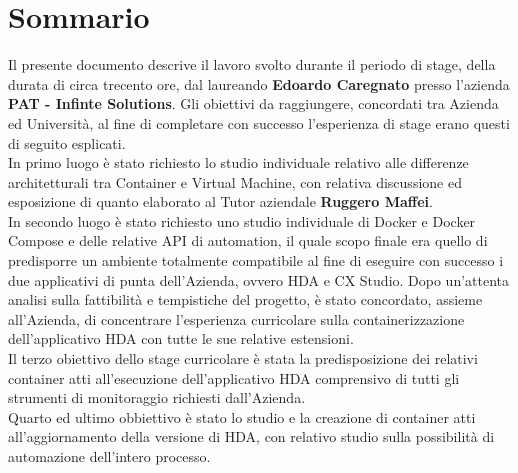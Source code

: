
\cleardoublepage
{}
{}
\begingroup
\let\clearpage\relax
\let\cleardoublepage\relax
\let\cleardoublepage\relax

\chapter*{Sommario}

Il presente documento descrive il lavoro svolto durante il periodo di stage, della durata di circa trecento ore, dal laureando \textbf{Edoardo Caregnato} presso l'azienda \textbf{PAT - Infinte Solutions}.
Gli obiettivi da raggiungere, concordati tra Azienda ed Università, al fine di completare con successo l'esperienza di stage erano questi di seguito esplicati.\\
In primo luogo è stato richiesto lo studio individuale relativo alle differenze architetturali tra \gls{Container} e \gls{Virtual Machine}, con relativa discussione ed esposizione di quanto elaborato al Tutor aziendale \textbf{Ruggero Maffei}.\\
In secondo luogo è stato richiesto uno studio individuale di \gls{Docker} e \gls{Docker Compose} e delle relative \gls{API} di automation, il quale scopo finale era quello di predisporre un ambiente totalmente compatibile al fine di eseguire con successo i due applicativi di punta dell'Azienda, ovvero \gls{HDA} e \gls{CX Studio}. Dopo un'attenta analisi sulla fattibilità e tempistiche del progetto, è stato concordato, assieme all'Azienda, di concentrare l'esperienza curricolare sulla containerizzazione dell'applicativo \gls{HDA} con tutte le sue relative estensioni.\\
Il terzo obiettivo dello stage curricolare è stata la predisposizione dei relativi container atti all'esecuzione dell'applicativo \gls{HDA} comprensivo di tutti gli strumenti di monitoraggio richiesti dall'Azienda.\\
Quarto ed ultimo obbiettivo è stato lo studio e la creazione di container atti all'aggiornamento della versione di \gls{HDA}, con relativo studio sulla possibilità di automazione dell'intero processo.

%
%

\endgroup			

\vfill

